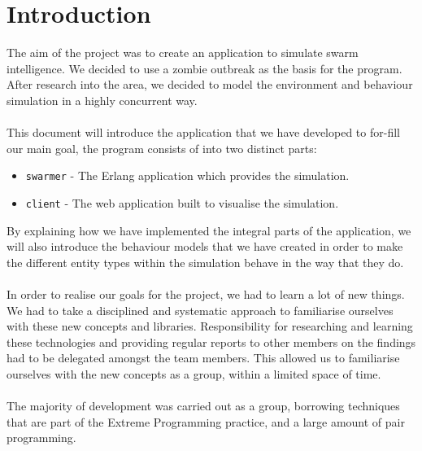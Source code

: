 \documentclass[10pt, a4paper, conference, compsocconf]{IEEEtran}
\begin{document}
\section{Introduction \label{intro}}
The aim of the project was to create an application to simulate swarm intelligence. We decided to use a zombie outbreak as the basis for the program. After research into the area, we decided to model the environment and behaviour simulation in a highly concurrent way.\\
\\
This document will introduce the application that we have developed to for-fill our main goal, the program consists of into two distinct parts:
\begin{itemize}
    \item \verb+swarmer+ - The Erlang application which provides the simulation.
    \item \verb+client+ - The web application built to visualise the simulation.
\end{itemize}
By explaining how we have implemented the integral parts of the application, we will also introduce the behaviour models that we have created in order to make the different entity types within the simulation behave in the way that they do.\\
\\%
In order to realise our goals for the project, we had to learn a lot of new things. We had to take a disciplined and systematic approach to familiarise ourselves with these new concepts and libraries. Responsibility for researching and learning these technologies and providing regular reports to other members on the findings had to be delegated amongst the team members. This allowed us to familiarise ourselves with the new concepts as a group, within a limited space of time.\\
\\%
The majority of development was carried out as a group, borrowing techniques that are part of the Extreme Programming practice, and a large amount of pair programming.\\
\end{document}

